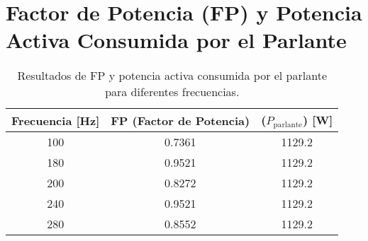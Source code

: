 
\section*{Factor de Potencia (FP) y Potencia Activa Consumida por el Parlante}

\begin{table}[h!]
\centering
\begin{tabular}{ccc}
\toprule
\textbf{Frecuencia [Hz]} & \textbf{FP (Factor de Potencia)} & \textbf{($P_{\text{parlante}}$) [W]} \\
\midrule
100  & 0.7361 & 1129.2 \\
180  & 0.9521 & 1129.2 \\
200  & 0.8272 & 1129.2 \\
240  & 0.9521 & 1129.2 \\
280  & 0.8552 & 1129.2 \\
\bottomrule
\end{tabular}
\caption{Resultados de FP y potencia activa consumida por el parlante para diferentes frecuencias.}
\label{table:resultados}
\end{table}
